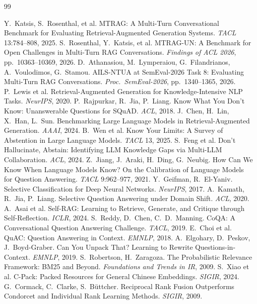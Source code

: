 \documentclass[11pt,a4paper]{report}
\begin{document}
\begin{thebibliography}{99}
 Y.~Katsis, S.~Rosenthal, et al. MTRAG: A Multi-Turn Conversational Benchmark for Evaluating Retrieval-Augmented Generation Systems. \emph{TACL} 13:784--808, 2025.
 S.~Rosenthal, Y.~Katsis, et al. MTRAG-UN: A Benchmark for Open Challenges in Multi-Turn RAG Conversations. \emph{Findings of ACL 2026}, pp.~10363--10369, 2026.
 D.~Athanasiou, M.~Lymperaiou, G.~Filandrianos, A.~Voulodimos, G.~Stamou. AILS-NTUA at SemEval-2026 Task 8: Evaluating Multi-Turn RAG Conversations. \emph{Proc.\ SemEval-2026}, pp.~1340--1365, 2026.
 P.~Lewis et al. Retrieval-Augmented Generation for Knowledge-Intensive NLP Tasks. \emph{NeurIPS}, 2020.
 P.~Rajpurkar, R.~Jia, P.~Liang. Know What You Don't Know: Unanswerable Questions for SQuAD. \emph{ACL}, 2018.
 J.~Chen, H.~Lin, X.~Han, L.~Sun. Benchmarking Large Language Models in Retrieval-Augmented Generation. \emph{AAAI}, 2024.
 B.~Wen et al. Know Your Limits: A Survey of Abstention in Large Language Models. \emph{TACL} 13, 2025.
 S.~Feng et al. Don't Hallucinate, Abstain: Identifying LLM Knowledge Gaps via Multi-LLM Collaboration. \emph{ACL}, 2024.
 Z.~Jiang, J.~Araki, H.~Ding, G.~Neubig. How Can We Know When Language Models Know? On the Calibration of Language Models for Question Answering. \emph{TACL} 9:962--977, 2021.
 Y.~Geifman, R.~El-Yaniv. Selective Classification for Deep Neural Networks. \emph{NeurIPS}, 2017.
 A.~Kamath, R.~Jia, P.~Liang. Selective Question Answering under Domain Shift. \emph{ACL}, 2020.
 A.~Asai et al. Self-RAG: Learning to Retrieve, Generate, and Critique through Self-Reflection. \emph{ICLR}, 2024.
 S.~Reddy, D.~Chen, C.~D.~Manning. CoQA: A Conversational Question Answering Challenge. \emph{TACL}, 2019.
 E.~Choi et al. QuAC: Question Answering in Context. \emph{EMNLP}, 2018.
 A.~Elgohary, D.~Peskov, J.~Boyd-Graber. Can You Unpack That? Learning to Rewrite Questions-in-Context. \emph{EMNLP}, 2019.
 S.~Robertson, H.~Zaragoza. The Probabilistic Relevance Framework: BM25 and Beyond. \emph{Foundations and Trends in IR}, 2009.
 S.~Xiao et al. C-Pack: Packed Resources for General Chinese Embeddings. \emph{SIGIR}, 2024.
 G.~Cormack, C.~Clarke, S.~B\"uttcher. Reciprocal Rank Fusion Outperforms Condorcet and Individual Rank Learning Methods. \emph{SIGIR}, 2009.

\end{thebibliography}
\end{document}
